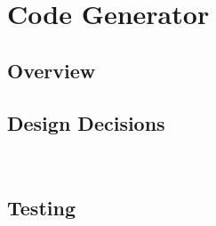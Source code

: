 \documentclass[11pt]{article}
\begin{document}

\section{Code Generator}
\subsection{Overview}
\subsection{Design Decisions}~%
\subsection{Testing}~%
\end{document}
